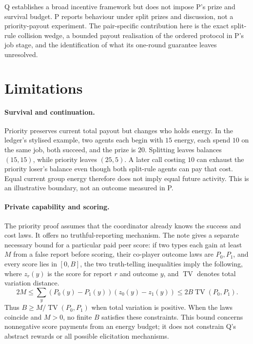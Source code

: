 \documentclass{article}
\begin{document}
Q establishes a broad incentive framework but does not impose P's prize and survival budget. P reports behaviour under split prizes and discussion, not a priority-payout experiment. The pair-specific contribution here is the exact split-rule collision wedge, a bounded payout realisation of the ordered protocol in P's job stage, and the identification of what its one-round guarantee leaves unresolved. %

\section{Limitations}

\paragraph{Survival and continuation.} Priority preserves current total payout but changes who holds energy. In the ledger's stylised example, two agents each begin with \(15\) energy, each spend \(10\) on the same job, both succeed, and the prize is \(20\). Splitting leaves balances \((15,15)\), while priority leaves \((25,5)\). A later call costing \(10\) can exhaust the priority loser's balance even though both split-rule agents can pay that cost. Equal current group energy therefore does not imply equal future activity. This is an illustrative boundary, not an outcome measured in P. %

\paragraph{Private capability and scoring.} The priority proof assumes that the coordinator already knows the success and cost laws. It offers no truthful-reporting mechanism. The note gives a separate necessary bound for a particular paid peer score: if two types each gain at least \(M\) from a false report before scoring, their co-player outcome laws are \(P_0,P_1\), and every score lies in \([0,B]\), the two truth-telling inequalities imply the following, where \(z_r(y)\) is the score for report \(r\) and outcome \(y\), and \(\operatorname{TV}\) denotes total variation distance. %
\[
2M\leq\sum_y(P_0(y)-P_1(y))(z_0(y)-z_1(y))
\leq2B\operatorname{TV}(P_0,P_1).
\]
Thus \(B\geq M/\operatorname{TV}(P_0,P_1)\) when total variation is positive. When the laws coincide and \(M>0\), no finite \(B\) satisfies these constraints. This bound concerns nonnegative score payments from an energy budget; it does not constrain Q's abstract rewards or all possible elicitation mechanisms. %
\end{document}
